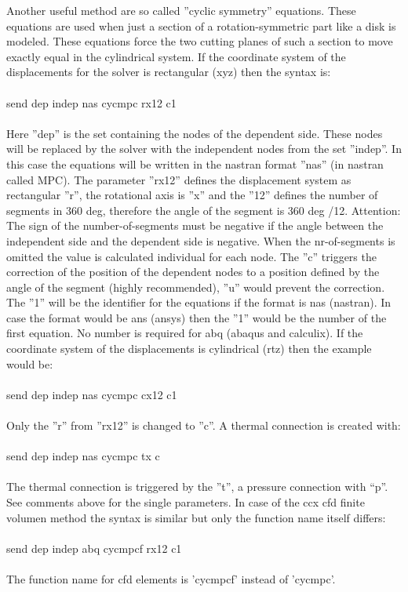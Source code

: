 \documentclass{article}
\begin{document}
Another useful method are so called ''cyclic symmetry'' equations. These equations are used when just a section of a rotation-symmetric part like a disk is modeled. These equations force the two cutting planes of such a section to move exactly equal in the cylindrical system. If the coordinate system of the displacements for the solver is rectangular (xyz) then the syntax is:\\\\send dep indep nas cycmpc rx12 c1\\\\Here ''dep'' is the set containing the nodes of the dependent side. These nodes will be replaced by the solver with the independent nodes from the set ''indep''. In this case the equations will be written in the nastran format ''nas'' (in nastran called MPC). The parameter ''rx12'' defines the displacement system as rectangular ''r'', the rotational axis is ''x'' and the ''12'' defines the number of segments in 360 deg, therefore the angle of the segment is 360 deg /12. Attention: The sign of the number-of-segments must be negative if the angle between the independent side and the dependent side is negative. When the nr-of-segments is omitted the value is calculated individual for each node. The ''c'' triggers the correction of the position of the dependent nodes to a position defined by the angle of the segment (highly recommended), ''u'' would prevent the correction. The ''1'' will be the identifier for the equations if the format is nas (nastran). In case the format would be ans (ansys) then the ''1'' would be the number of the first equation. No number is required for abq (abaqus and calculix). If the coordinate system of the displacements is cylindrical (rtz) then the example would be:\\\\send dep indep nas cycmpc cx12 c1\\\\Only the ''r'' from ''rx12'' is changed to ''c''. A thermal connection is created with:\\\\send dep indep nas cycmpc tx c\\\\The thermal connection is triggered by the ''t'', a pressure connection with ``p''. See comments above for the single parameters. In case of the ccx cfd finite volumen method the syntax is similar but only the function name itself differs:\\\\send dep indep abq cycmpcf rx12 c1\\\\The function name for cfd elements is 'cycmpcf' instead of 'cycmpc'.
\end{document}
